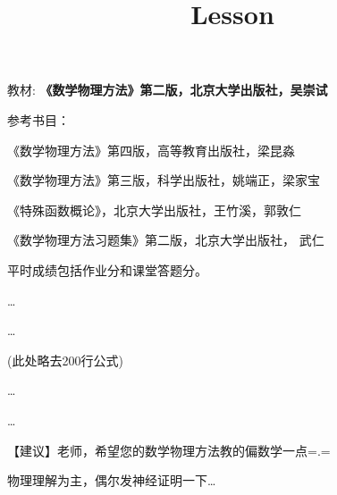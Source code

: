 \documentclass[CJK]{beamer}
\title{Lesson }
\author{}
\date{}
\begin{document}


\begin{frame}
\bch
{}
\ech
\end{frame}


\begin{frame}
\bch
教材:
{\bf \blue《数学物理方法》第二版，北京大学出版社，吴崇试}

\skiplines

参考书目：
\bitem
\item{《数学物理方法》第四版，高等教育出版社，梁昆淼}  
\item{《数学物理方法》第三版，科学出版社，姚端正，梁家宝}
\item{《特殊函数概论》，北京大学出版社，王竹溪，郭敦仁}
\item{《数学物理方法习题集》第二版，北京大学出版社， 武仁}
  \eitem
\ech
\end{frame}


\begin{frame}
\bch
{}

平时成绩包括作业分和课堂答题分。

\ech
\end{frame}

\begin{frame}
  \bch

  
  \ldots

  \ldots  

  (此处略去200行公式)
  
  \ldots

  \ldots
  
【建议】老师，希望您的数学物理方法教的偏数学一点=.= \\

  
  \ech
\end{frame}


\begin{frame}
  \bch

  {\Large 物理理解为主，偶尔发神经证明一下…}


  
  
  \ech
\end{frame}
\end{document}
